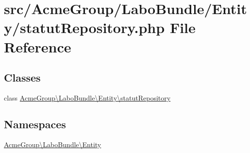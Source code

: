 \hypertarget{statut_repository_8php}{\section{src/\+Acme\+Group/\+Labo\+Bundle/\+Entity/statut\+Repository.php File Reference}
\label{statut_repository_8php}
}
\subsection*{Classes}
\begin{DoxyCompactItemize}
\item 
class \hyperlink{class_acme_group_1_1_labo_bundle_1_1_entity_1_1statut_repository}{Acme\+Group\textbackslash{}\+Labo\+Bundle\textbackslash{}\+Entity\textbackslash{}statut\+Repository}
\end{DoxyCompactItemize}
\subsection*{Namespaces}
\begin{DoxyCompactItemize}
\item 
 \hyperlink{namespace_acme_group_1_1_labo_bundle_1_1_entity}{Acme\+Group\textbackslash{}\+Labo\+Bundle\textbackslash{}\+Entity}
\end{DoxyCompactItemize}
